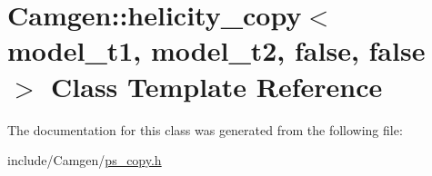 \hypertarget{a00263}{\section{Camgen\-:\-:helicity\-\_\-copy$<$ model\-\_\-t1, model\-\_\-t2, false, false $>$ Class Template Reference}
\label{a00263}
}


The documentation for this class was generated from the following file\-:\begin{DoxyCompactItemize}
\item 
include/\-Camgen/\hyperlink{a00712}{ps\-\_\-copy.\-h}\end{DoxyCompactItemize}
